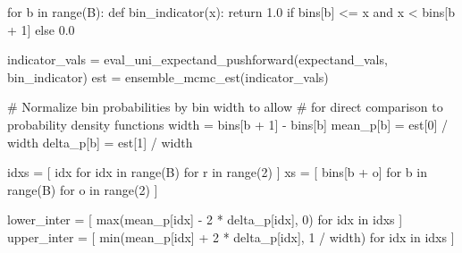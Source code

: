 \documentclass[
  letterpaper,
  DIV=11,
  numbers=noendperiod]{scrartcl}
\newenvironment{Shaded}{\begin{snugshade}}{\end{snugshade}}
\newcommand{\BuiltInTok}[1]{\textcolor[rgb]{0.00,0.23,0.31}{#1}}
\newcommand{\CommentTok}[1]{\textcolor[rgb]{0.37,0.37,0.37}{#1}}
\newcommand{\ControlFlowTok}[1]{\textcolor[rgb]{0.00,0.23,0.31}{#1}}
\newcommand{\DecValTok}[1]{\textcolor[rgb]{0.68,0.00,0.00}{#1}}
\newcommand{\FloatTok}[1]{\textcolor[rgb]{0.68,0.00,0.00}{#1}}
\newcommand{\KeywordTok}[1]{\textcolor[rgb]{0.00,0.23,0.31}{#1}}
\newcommand{\NormalTok}[1]{\textcolor[rgb]{0.00,0.23,0.31}{#1}}
\newcommand{\OperatorTok}[1]{\textcolor[rgb]{0.37,0.37,0.37}{#1}}
\begin{document}
\begin{Shaded}
\begin{Highlighting}[]
  \ControlFlowTok{for}\NormalTok{ b }\KeywordTok{in} \BuiltInTok{range}\NormalTok{(B):}
    \KeywordTok{def}\NormalTok{ bin\_indicator(x):}
      \ControlFlowTok{return} \FloatTok{1.0} \ControlFlowTok{if}\NormalTok{ bins[b] }\OperatorTok{\textless{}=}\NormalTok{ x }\KeywordTok{and}\NormalTok{ x }\OperatorTok{\textless{}}\NormalTok{ bins[b }\OperatorTok{+} \DecValTok{1}\NormalTok{] }\ControlFlowTok{else} \FloatTok{0.0}
    
\NormalTok{    indicator\_vals }\OperatorTok{=}\NormalTok{ eval\_uni\_expectand\_pushforward(expectand\_vals,}
\NormalTok{                                                    bin\_indicator)}
\NormalTok{    est }\OperatorTok{=}\NormalTok{ ensemble\_mcmc\_est(indicator\_vals)}
    
    \CommentTok{\# Normalize bin probabilities by bin width to allow}
    \CommentTok{\# for direct comparison to probability density functions}
\NormalTok{    width }\OperatorTok{=}\NormalTok{ bins[b }\OperatorTok{+} \DecValTok{1}\NormalTok{] }\OperatorTok{{-}}\NormalTok{ bins[b]}
\NormalTok{    mean\_p[b] }\OperatorTok{=}\NormalTok{ est[}\DecValTok{0}\NormalTok{] }\OperatorTok{/}\NormalTok{ width}
\NormalTok{    delta\_p[b] }\OperatorTok{=}\NormalTok{ est[}\DecValTok{1}\NormalTok{] }\OperatorTok{/}\NormalTok{ width}
  
\NormalTok{  idxs }\OperatorTok{=}\NormalTok{ [ idx }\ControlFlowTok{for}\NormalTok{ idx }\KeywordTok{in} \BuiltInTok{range}\NormalTok{(B) }\ControlFlowTok{for}\NormalTok{ r }\KeywordTok{in} \BuiltInTok{range}\NormalTok{(}\DecValTok{2}\NormalTok{) ]}
\NormalTok{  xs }\OperatorTok{=}\NormalTok{ [ bins[b }\OperatorTok{+}\NormalTok{ o] }\ControlFlowTok{for}\NormalTok{ b }\KeywordTok{in} \BuiltInTok{range}\NormalTok{(B) }\ControlFlowTok{for}\NormalTok{ o }\KeywordTok{in} \BuiltInTok{range}\NormalTok{(}\DecValTok{2}\NormalTok{) ]}
  
\NormalTok{  lower\_inter }\OperatorTok{=}\NormalTok{ [ }\BuiltInTok{max}\NormalTok{(mean\_p[idx] }\OperatorTok{{-}} \DecValTok{2} \OperatorTok{*}\NormalTok{ delta\_p[idx], }\DecValTok{0}\NormalTok{)}
                  \ControlFlowTok{for}\NormalTok{ idx }\KeywordTok{in}\NormalTok{ idxs ]}
\NormalTok{  upper\_inter }\OperatorTok{=}\NormalTok{ [ }\BuiltInTok{min}\NormalTok{(mean\_p[idx] }\OperatorTok{+} \DecValTok{2} \OperatorTok{*}\NormalTok{ delta\_p[idx], }\DecValTok{1} \OperatorTok{/}\NormalTok{ width) }
                  \ControlFlowTok{for}\NormalTok{ idx }\KeywordTok{in}\NormalTok{ idxs ]}
  

\end{Highlighting}
\end{Shaded}
\end{document}
